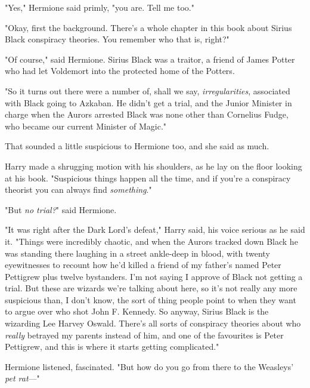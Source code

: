 "Yes," Hermione said primly, "you are. Tell me too."

"Okay, first the background. There's a whole chapter in this book about Sirius
Black conspiracy theories. You remember who that is, right?"

"Of course," said Hermione. Sirius Black was a traitor, a friend of James
Potter who had let Voldemort into the protected home of the Potters.

"So it turns out there were a number of, shall we say, \emph{irregularities},
associated with Black going to Azkaban. He didn't get a trial, and the Junior
Minister in charge when the Aurors arrested Black was none other than Cornelius
Fudge, who became our current Minister of Magic."

That sounded a little suspicious to Hermione too, and she said as much.

Harry made a shrugging motion with his shoulders, as he lay on the floor
looking at his book. "Suspicious things happen all the time, and if you're a
conspiracy theorist you can always find \emph{something}."

"But \emph{no trial?}" said Hermione.

"It was right after the Dark Lord's defeat," Harry said, his voice serious as
he said it. "Things were incredibly chaotic, and when the Aurors tracked down
Black he was standing there laughing in a street ankle-deep in blood, with
twenty eyewitnesses to recount how he'd killed a friend of my father's named
Peter Pettigrew plus twelve bystanders. I'm not saying I approve of Black not
getting a trial. But these are wizards we're talking about here, so it's not
really any more suspicious than, I don't know, the sort of thing people point
to when they want to argue over who shot John F. Kennedy. So anyway, Sirius
Black is the wizarding Lee Harvey Oswald. There's all sorts of conspiracy
theories about who \emph{really} betrayed my parents instead of him, and one of
the favourites is Peter Pettigrew, and this is where it starts getting
complicated."

Hermione listened, fascinated. "But how do you go from there to the Weasleys'
\emph{pet rat}---"

